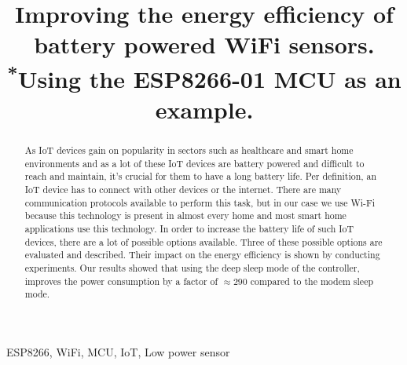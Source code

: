 \documentclass[conference]{IEEEtran}
\begin{document}
\title{Improving the energy efficiency of battery powered WiFi sensors.\\
{\footnotesize \textsuperscript{*}Using the ESP8266-01 MCU as an example.}
}

\author{
\and
{}
\and
{}
}

\maketitle

\begin{abstract}
As IoT devices gain on popularity in sectors such as healthcare and smart home environments and as a lot of these IoT devices are battery powered and difficult to reach and maintain, it's crucial for them to have a long battery life.
Per definition, an IoT device has to connect with other devices or the internet. 
There are many communication protocols available to perform this task, but in our case we use Wi-Fi because this technology is present in almost every home and most smart home applications use this technology.
In order to increase the battery life of such IoT devices, there are a lot of possible options available.
Three of these possible options are evaluated and described. Their impact on the energy efficiency is shown by conducting experiments.
Our results showed that using the deep sleep mode of the controller, improves the power consumption by a factor of $\approx 290$ compared to the modem sleep mode.


\end{abstract}

\begin{IEEEkeywords}
ESP8266, WiFi, MCU, IoT, Low power sensor
\end{IEEEkeywords}
\end{document}
